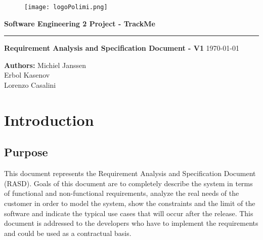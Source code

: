 \documentclass[12pt]{article}
\begin{document}
\begin{titlepage}
    \begin{center}
    \begin{figure}
        \centering
        \texttt{[image: logoPolimi.png]}
        \vspace{1.5cm}
    \end{figure}

    \Huge\textbf{Software Engineering 2 Project - TrackMe}
    \rule{12cm}{0.5pt}
    \Huge\textbf{Requirement Analysis and Specification Document - V1}
    \today
    \end{center}
    
    \vspace{3cm}
    
    \begin{flushleft}
        \LARGE\textbf{Authors: }
        \newline\newline
        \Large\texttt{}{Michiel Janssen \\ Erbol Kasenov \\ Lorenzo Casalini}
    \end{flushleft}
\end{titlepage}

\newpage
  \tableofcontents
\newpage

\section{Introduction}
\subsection{Purpose}
This document represents the Requirement Analysis and Specification Document (RASD). Goals of this document are to completely describe the system in terms of functional and non-functional requirements, analyze the real needs of the customer in order to model the system, show the constraints and the limit of the software and indicate the typical use cases that will occur after the release. This document is addressed to the developers who have to implement the requirements and could be used as a contractual basis.
\end{document}
